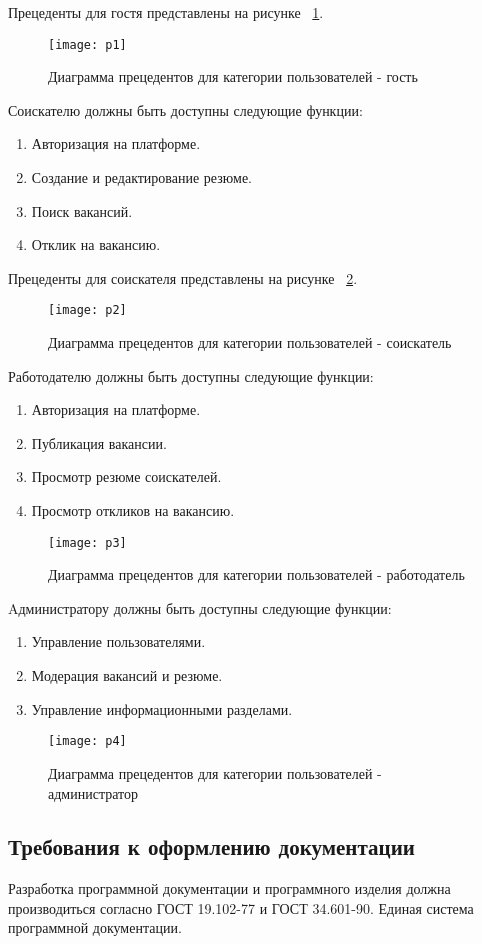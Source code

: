 Прецеденты для гостя представлены на рисунке ~\ref{p1:image}.

\begin{figure}[H]
	\texttt{[image: p1]}
	\caption{Диаграмма прецедентов для категории пользователей - гость}
	\label{p1:image}
\end{figure}

Соискателю должны быть доступны следующие функции:

\begin{enumerate}
	\item Авторизация на платформе.
	\item Создание и редактирование резюме.
	\item Поиск вакансий.
	\item Отклик на вакансию.
\end{enumerate}

Прецеденты для соискателя представлены на рисунке ~\ref{p2:image}.

\begin{figure}[H]
	\texttt{[image: p2]}
	\caption{Диаграмма прецедентов для категории пользователей - соискатель}
	\label{p2:image}
\end{figure}

Работодателю должны быть доступны следующие функции:

\begin{enumerate}
	\item Авторизация на платформе.
	\item Публикация вакансии.
	\item Просмотр резюме соискателей.
	\item Просмотр откликов на вакансию.
\end{enumerate}

\begin{figure}[H]
	\texttt{[image: p3]}
	\caption{Диаграмма прецедентов для категории пользователей - работодатель}
	\label{p3:image}
\end{figure}

Aдминистратору должны быть доступны следующие функции:

\begin{enumerate}
	\item Управление пользователями.
	\item Модерация вакансий и резюме.
	\item Управление информационными разделами.
\end{enumerate}

\begin{figure}[H]
	\texttt{[image: p4]}
	\caption{Диаграмма прецедентов для категории пользователей - администратор}
	\label{p4:image}
\end{figure}

\subsection{Требования к оформлению документации}

Разработка программной документации и программного изделия должна производиться согласно ГОСТ 19.102-77 и ГОСТ 34.601-90. Единая система программной документации.
